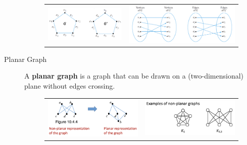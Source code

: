 \documentclass{article}
\begin{document}
\begin{description}
    \begin{figure}[H]
		\centering
		\begin{tabular}{ll}
			\includegraphics[scale=0.6]{isomorphic_graph} &
			\includegraphics[scale=0.6]{isomorphic_bijection}
		\end{tabular}
	\end{figure}
    
    \item[Planar Graph] A \textbf{planar graph} is a graph that can be drawn on a (two-dimensional) plane without edges crossing.
    
    \begin{figure}[H]
		\centering
		\begin{tabular}{ll}
			\includegraphics[scale=0.4]{planar_graph} &
			\includegraphics[scale=0.4]{nonplanar_graph}
		\end{tabular}
	\end{figure}
	

\end{description}
\end{document}
